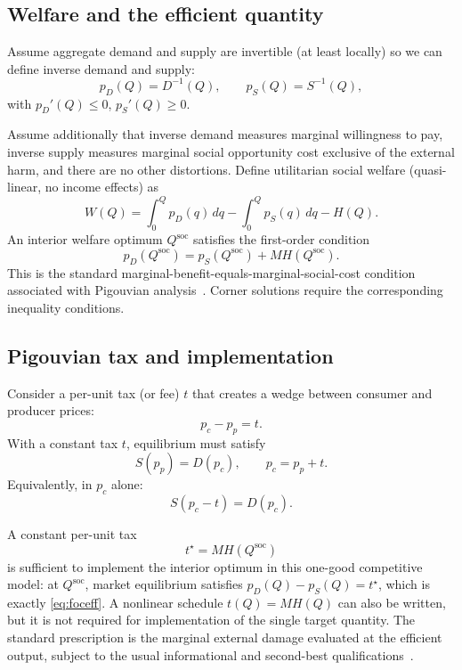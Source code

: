 \documentclass[journal, a4paper]{IEEEtran}
\begin{document}
\subsection{Welfare and the efficient quantity}
Assume aggregate demand and supply are invertible (at least locally) so we can define inverse demand and supply:
\begin{equation}
p_D(Q) = D^{-1}(Q),\qquad p_S(Q)=S^{-1}(Q),
\end{equation}
with $p_D'(Q)\le 0$, $p_S'(Q)\ge 0$.

Assume additionally that inverse demand measures marginal willingness to pay, inverse supply measures marginal social opportunity cost exclusive of the external harm, and there are no other distortions. Define utilitarian social welfare (quasi-linear, no income effects) as
\begin{equation}
W(Q)=\int_0^Q p_D(q)\,dq - \int_0^Q p_S(q)\,dq - H(Q).
\label{eq:welfare}
\end{equation}
An interior welfare optimum $Q^{\text{soc}}$ satisfies the first-order condition
\begin{equation}
p_D(Q^{\text{soc}})=p_S(Q^{\text{soc}})+MH(Q^{\text{soc}}).
\label{eq:foceff}
\end{equation}
This is the standard marginal-benefit-equals-marginal-social-cost condition associated with Pigouvian analysis~\cite{Pigou1932,Baumol1972}. Corner solutions require the corresponding inequality conditions.

\subsection{Pigouvian tax and implementation}
Consider a per-unit tax (or fee) $t$ that creates a wedge between consumer and producer prices:
\begin{equation}
p_c - p_p = t.
\end{equation}
With a constant tax $t$, equilibrium must satisfy
\begin{equation}
S(p_p)=D(p_c),\qquad p_c=p_p+t.
\end{equation}
Equivalently, in $p_c$ alone:
\begin{equation}
S(p_c-t)=D(p_c).
\label{eq:wedgeeq}
\end{equation}

A constant per-unit tax
\begin{equation}
t^\star=MH(Q^{\text{soc}})
\label{eq:pigtax}
\end{equation}
is sufficient to implement the interior optimum in this one-good competitive model: at $Q^{\text{soc}}$, market equilibrium satisfies $p_D(Q)-p_S(Q)=t^\star$, which is exactly \eqref{eq:foceff}. A nonlinear schedule $t(Q)=MH(Q)$ can also be written, but it is not required for implementation of the single target quantity. The standard prescription is the marginal external damage evaluated at the efficient output, subject to the usual informational and second-best qualifications~\cite{Baumol1972,Coase1960}.
\end{document}
